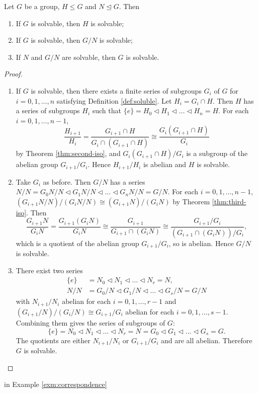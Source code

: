 \begin{theorem} \label{thm:soluble-main-appendix}
	Let $G$ be a group, $H \le G$ and $N \trianglelefteq G$. Then 
	\begin{enumerate}
		\item If $G$ is solvable, then $H$ is solvable;
		\item If $G$ is solvable, then $G / N$ is solvable; 
		\item If $N$ and $G / N$ are solvable, then $G$ is solvable. 
	\end{enumerate}
\end{theorem}
\begin{proof}
	\begin{enumerate}
		\item If $G$ is solvable, then there exists a finite series of subgroups $G_i$ of $G$ for $i = 0, 1, \dots, n$ satisfying Definition \ref{def:soluble}. Let $H_i = G_i \cap H$. Then $H$ has a series of subgroups $H_i$ such that $\{ e \} = H_0 \triangleleft H_1 \triangleleft \dots \triangleleft H_n = H.$
		For each $i = 0, 1, \dots, n - 1$, 
		$$
		\frac{H_{i+1}}{H_i} 
		= \frac{G_{i+1} \cap H}{G_i \cap (G_{i+1} \cap H)}
		\cong \frac{G_i(G_{i+1} \cap H)} {G_i}
		$$
		by Theorem \ref{thm:second-iso}, and ${G_i(G_{i+1} \cap H)}/{G_i}$ is a subgroup of the abelian group $G_{i+1} / G_{i}$. Hence $H_{i+1} / H_{i}$ is abelian and $H$ is solvable.
		\item Take $G_i$ as before. Then $G / N$ has a series
		$N/N = G_0 N / N \triangleleft G_1 N / N \triangleleft \dots \triangleleft G_n N / N  =  G / N. $
		For each $i = 0, 1, \dots, n - 1$, 
		$(G_{i+1} N / N) / (G_{i} N / N) \cong (G_{i+1} N) / (G_i N)$
		by Theorem \ref{thm:third-iso}. Then 
		$$
		\frac{G_{i+1} N}{G_i N} =\frac{G_{i+1}\left(G_i N\right)}{G_i N} \cong \frac{G_{i+1}}{G_{i+1} \cap\left(G_i N\right)} \cong \frac{G_{i+1} / G_i}{\left(G_{i+1} \cap\left(G_i N\right)\right) / G_i},
		$$
		which is a quotient of the abelian group $G_{i+1} / G_i$, so is abelian. Hence $G / N$ is solvable.
		\item There exist two series
		$$
		\begin{aligned}
			\{ e \} & =N_0 \triangleleft N_1 \triangleleft \ldots \triangleleft N_r=N, \\
			N / N & =G_0 / N \triangleleft G_1 / N \triangleleft \ldots \triangleleft G_s / N=G / N
		\end{aligned}
		$$
		with $N_{i+1} / N_{i}$ abelian for each $i = 0, 1, \dots, r-1$ and $(G_{i+1} / N)  / (G_{i} / N) \cong G_{i+1} / G_i $ abelian for each $i = 0,1, \dots, s-1$. Combining them gives the series of subgroups of $G$:
		$$
		\{ e \}=N_0 \triangleleft N_1 \triangleleft \ldots \triangleleft N_r=N=G_0 \triangleleft G_1 \triangleleft \ldots \triangleleft G_s=G .
		$$
		The quotients are either $N_{i+1} / N_i$  or $G_{i+1} / G_i$ and are all abelian. Therefore $G$ is solvable.
	\end{enumerate}
\end{proof}
in Example \ref{exm:correspondence}

